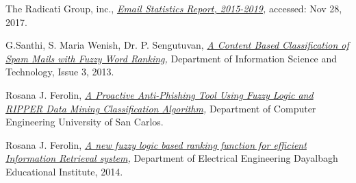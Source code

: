 \documentclass[journal]{IEEEtran}
\begin{document}
\begin{thebibliography}{9}
    The Radicati Group, inc.,
    \textit{
        \href{https://github.com/Menziess/Fuzzy-Logic-Email-Classification/raw/master/report/res/a_new_fuzzy_logic_based_ranking_function_for_efficient_information_retrieval_system.pdf}{Email Statistics Report, 2015-2019},
    }
    accessed: Nov 28, 2017.

    G.Santhi, S. Maria Wenish, Dr. P. Sengutuvan,
    \textit{
        \href{https://github.com/Menziess/Fuzzy-Logic-Email-Classification/raw/master/report/res/a_content_based_classification_of_spam_mails_with_fuzzy_word_ranking.pdf}{A Content Based Classification of Spam Mails with Fuzzy Word Ranking},
    }
    Department of Information Science and Technology,
    Issue 3,
    2013.

    Rosana J. Ferolin,
    \textit{
        \href{https://github.com/Menziess/Fuzzy-Logic-Email-Classification/raw/master/report/res/a_proactive_anti-phishing_tool_using_fuzzy_logic_and_ripper_data_mining_classification_algorithm.pdf}{A Proactive Anti-Phishing Tool Using Fuzzy Logic and RIPPER Data Mining Classification Algorithm},
    }
    Department of Computer Engineering University of San Carlos.

    Rosana J. Ferolin,
    \textit{
        \href{https://github.com/Menziess/Fuzzy-Logic-Email-Classification/raw/master/report/res/a_new_fuzzy_logic_based_ranking_function_for_efficient_information_retrieval_system.pdf}{A new fuzzy logic based ranking function for efficient Information Retrieval system},
    }
    Department of Electrical Engineering Dayalbagh Educational Institute,
    2014.

\end{thebibliography}
\end{document}
